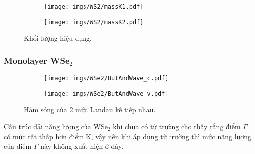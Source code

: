 \documentclass{article}
\begin{document}
\begin{figure}[htb]
	\begin{subfigure}{0.495\textwidth}
		\centering
		\texttt{[image: imgs/WS2/massK1.pdf]}
	\end{subfigure}
	\begin{subfigure}{0.495\textwidth}
		\centering
		\texttt{[image: imgs/WS2/massK2.pdf]}
	\end{subfigure}
	\caption{Khối lượng hiệu dụng.}
\end{figure}
\newpage
\subsubsection*{Monolayer WSe$_{2}$}
\begin{figure}[htb]
	\begin{subfigure}{0.495\textwidth}
		\centering
		\texttt{[image: imgs/WSe2/ButAndWave\_c.pdf]}
	\end{subfigure}
	\begin{subfigure}{0.495\textwidth}
		\centering
		\texttt{[image: imgs/WSe2/ButAndWave\_v.pdf]}
	\end{subfigure}
	\caption{Hàm sóng của 2 mức Landau kế tiếp nhau.}
\end{figure}
Cấu trúc dải năng lượng của WSe$_{2}$ khi chưa có từ trường cho thấy rằng điểm $\Gamma$ có mức rất thấp hơn điểm K, vậy nên khi áp dụng từ trường thì mức năng lượng của điểm $\Gamma$ này không xuất hiện ở đây. 
\end{document}
